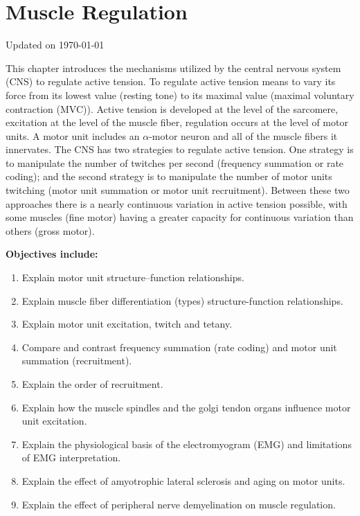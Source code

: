 \chapter{Muscle Regulation}\label{chp:regulation}
Updated on \today
\minitoc

This chapter introduces the mechanisms utilized by the central nervous system (CNS) to regulate active tension. To regulate active tension means to vary its force from its lowest value (resting tone) to its maximal value (maximal voluntary contraction (MVC)). Active tension is developed at the level of the sarcomere, excitation at the level of the muscle fiber, regulation occurs at the level of motor units. A motor unit includes an $\alpha$-motor neuron and all of the muscle fibers it innervates. The CNS has two strategies to regulate active tension. One strategy is to manipulate the number of twitches per second (frequency summation or rate coding); and the second strategy is to manipulate the number of motor units twitching (motor unit summation or motor unit recruitment). Between these two approaches there is a nearly continuous variation in active tension possible, with some muscles (fine motor) having a greater capacity for continuous variation than others (gross motor).

\vspace{5mm}

\textbf{Objectives include:}
\begin{enumerate}
    \item Explain motor unit structure–function relationships.
    \item Explain muscle fiber differentiation (types) structure-function relationships.
    \item Explain motor unit excitation, twitch and tetany.
    \item Compare and contrast frequency summation (rate coding) and motor unit summation (recruitment).
    \item Explain the order of recruitment.
    \item Explain how the muscle spindles and the golgi tendon organs influence motor unit excitation.
    \item Explain the physiological basis of the electromyogram (EMG) and limitations of EMG interpretation.
    \item Explain the effect of amyotrophic lateral sclerosis and aging on motor units.
    \item Explain the effect of peripheral nerve demyelination on muscle regulation.
\end{enumerate}\

